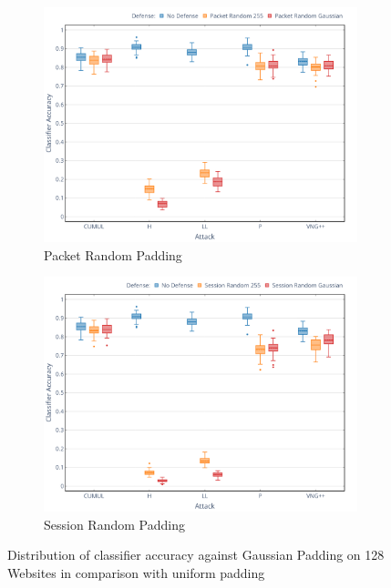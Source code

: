 \documentclass[
	ruledheaders=chapter,
	class=report,
	thesis={type=master, department=inf},
	accentcolor=1c,
	custommargins=true,
	marginpar=false,
	parskip=half-,
	fontsize=11pt,
]{tudapub}
\begin{document}
	\begin{figure}
		\begin{subfigure}{0.495\textwidth}
			\centering
			\includegraphics[width=\textwidth]{plots/significance_pkt.png}
			\caption{Packet Random Padding}
		\end{subfigure}
		\hfill
		\begin{subfigure}{0.495\textwidth}
			\centering
			\includegraphics[width=\textwidth]{plots/significance_ses.png}
			\caption{Session Random Padding}
		\end{subfigure}
		\caption[Distribution of classifier accuracy against Gaussian Padding on 128 Websites]{Distribution of classifier accuracy against Gaussian Padding on 128 Websites in comparison with uniform padding}
		\label{fig:performance_dist}
	\end{figure}
\end{document}
